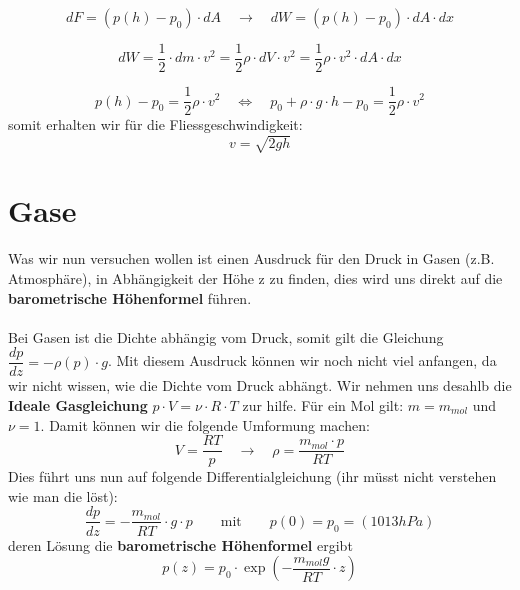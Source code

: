 \documentclass[12pt]{article}
\begin{document}
\begin{equation}
dF = \left(p(h)-p_0 \right) \cdot dA \quad \rightarrow \quad dW = \left(p(h)-p_0 \right) \cdot dA \cdot dx
\end{equation}

\begin{equation}
dW  = \dfrac{1}{2} \cdot dm \cdot v^2 = \dfrac{1}{2} \rho \cdot dV \cdot v^2 = \dfrac{1}{2} \rho \cdot v^2 \cdot dA \cdot dx
\end{equation}

\begin{equation}
p(h)-p_0 = \dfrac{1}{2} \rho \cdot v^2 \quad \Leftrightarrow \quad p_0 + \rho \cdot g \cdot h -p_0 = \dfrac{1}{2} \rho \cdot v^2
\end{equation}
somit erhalten wir für die Fliessgeschwindigkeit:
\begin{equation}
v = \sqrt{2gh}
\end{equation}

\section{Gase}
Was wir nun versuchen wollen ist einen Ausdruck für den Druck in Gasen (z.B. Atmosphäre), in Abhängigkeit der Höhe z zu finden, dies wird uns direkt auf die \textbf{barometrische Höhenformel} führen.\\
\\
Bei Gasen ist die Dichte abhängig vom Druck, somit gilt  die Gleichung  $\dfrac{dp}{dz} = -\rho (p) \cdot g$. Mit diesem Ausdruck können wir noch nicht viel anfangen, da wir nicht wissen, wie die Dichte vom Druck abhängt. Wir nehmen uns desahlb die \textbf{Ideale Gasgleichung} $p \cdot V = \nu \cdot R \cdot T$ zur hilfe. Für ein Mol gilt: $m = m_{mol}$ und $\nu = 1$. Damit können wir die folgende Umformung machen:
\begin{equation}
V = \dfrac{RT}{p} \quad \rightarrow \quad \rho = \dfrac{m_{mol} \cdot p}{RT}
\end{equation}
Dies führt uns nun auf folgende Differentialgleichung (ihr müsst nicht verstehen wie man die löst):
\begin{equation}
\dfrac{dp}{dz} = - \dfrac{m_{mol}}{RT} \cdot g \cdot p \qquad \mathrm{mit} \qquad p(0) = p_0 = (1013hPa)
\end{equation}
deren Lösung die \textbf{barometrische Höhenformel} ergibt
\begin{equation}
p(z) = p_0 \cdot \exp \left(- \dfrac{m_{mol}g}{RT} \cdot z \right)
\end{equation}
\clearpage
\end{document}

